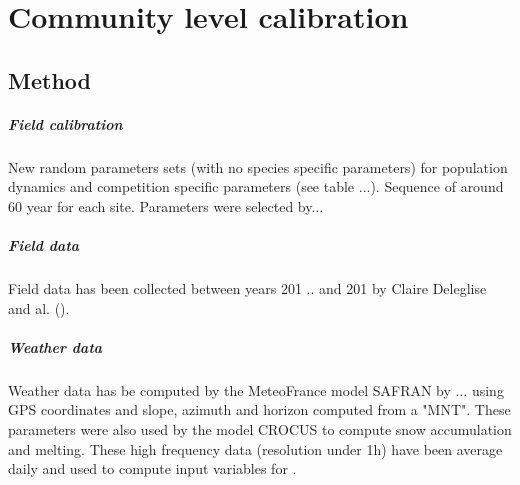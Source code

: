 
%
%

\chapter{Community level calibration}

\section{Method}

\paragraph{Field calibration}
New random parameters sets (with no species specific parameters) for population dynamics and competition specific parameters (see table ...).
Sequence of around 60 year for each site. Parameters were selected by...


\paragraph{Field data}
Field data has been collected between years 201 .. and 201 by Claire Deleglise and al. ().

\paragraph{Weather data}
Weather data has be computed by the MeteoFrance model SAFRAN by ... using GPS coordinates and slope, azimuth and horizon computed from a "MNT". These parameters were also used by the model CROCUS to compute snow accumulation and melting. These high frequency data (resolution under 1h) have been average daily and used to compute input variables for \model . 

